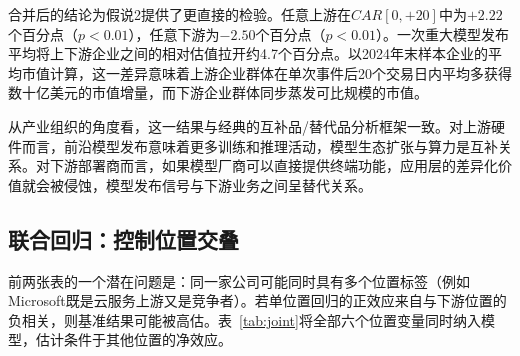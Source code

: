 \documentclass[11pt,fontset=fandol,a4paper]{ctexart}
\newcommand{\changed}[1]{{\color{orange!85!black}#1}}
\begin{document}
合并后的结论为假说2提供了更直接的检验。任意上游在$CAR[0,+20]$中为$+2.22$个百分点（$p<0.01$），任意下游为$-2.50$个百分点（$p<0.01$）。一次重大模型发布平均将上下游企业之间的相对估值拉开约4.7个百分点。以2024年末样本企业的平均市值计算，这一差异意味着上游企业群体在单次事件后20个交易日内平均多获得数十亿美元的市值增量，而下游企业群体同步蒸发可比规模的市值。

\changed{从产业组织的角度看，这一结果与经典的互补品/替代品分析框架一致。对上游硬件而言，前沿模型发布意味着更多训练和推理活动，模型生态扩张与算力是互补关系。对下游部署商而言，如果模型厂商可以直接提供终端功能，应用层的差异化价值就会被侵蚀，模型发布信号与下游业务之间呈替代关系。}

\subsection{联合回归：控制位置交叠}\label{sec:joint}

前两张表的一个潜在问题是：同一家公司可能同时具有多个位置标签（例如Microsoft既是云服务上游又是竞争者）。若单位置回归的正效应来自与下游位置的负相关，则基准结果可能被高估。表~\ref{tab:joint}将全部六个位置变量同时纳入模型，估计条件于其他位置的净效应。
\end{document}
